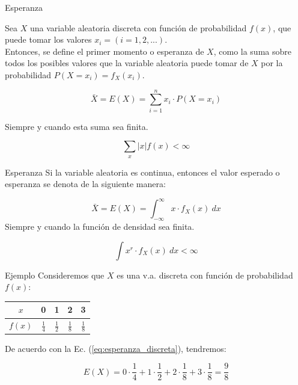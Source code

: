 \documentclass{beamer}
\begin{document}
\begin{frame}{Esperanza}

Sea $X$ una variable aleatoria discreta con función de probabilidad $f(x)$, que
puede tomar los valores $x_i=(i=1,2,...)$.\\

Entonces, se define el primer momento o esperanza de $X$, como la suma sobre todos los posibles
valores que la variable aleatoria puede tomar de $X$ por la probabilidad $P(X=x_i)=f_{X}(x_i)$.

\begin{equation}
  \bar{X} = E(X) = \sum_{i=1}^{n} x_i \cdot P(X=x_i)
  \label{eq:esperanza_discreta}
\end{equation}

Siempre y cuando esta suma sea finita.

\begin{equation}
  \sum_{x} |x| f(x) < \infty
\end{equation}

\end{frame}

\begin{frame}{Esperanza}
  Si la variable aleatoria es continua, entonces el valor esperado o esperanza se
  denota de la siguiente manera:

  \begin{equation}
    \bar{X} = E(X) = \int_{-\infty}^{\infty} x \cdot f_{X}(x) \ dx
  \end{equation}
  Siempre y cuando la función de densidad sea finita.

  \begin{equation}
    \int x^r \cdot f_{X}(x) \ dx < \infty
  \end{equation}

\end{frame}

\begin{frame}{Ejemplo}
  Consideremos que $X$ es una v.a. discreta con función de probabilidad $f(x)$:

  \begin{center}
  \begin{tabular}{c|cccc}
    $x$     & 0 & 1 & 2 & 3 \\
    \hline
    $f(x)$  & $\frac{1}{4}$ & $\frac{1}{2}$ & $\frac{1}{8}$ & $\frac{1}{8}$
  \end{tabular}
  \end{center}

  De acuerdo con la Ec. (\ref{eq:esperanza_discreta}), tendremos:

  \begin{equation}
    E(X) = 0 \cdot \frac{1}{4} + 1 \cdot \frac{1}{2} + 2 \cdot \frac{1}{8} + 3 \cdot \frac{1}{8} = \frac{9}{8}
  \end{equation}



\end{frame}
\end{document}
